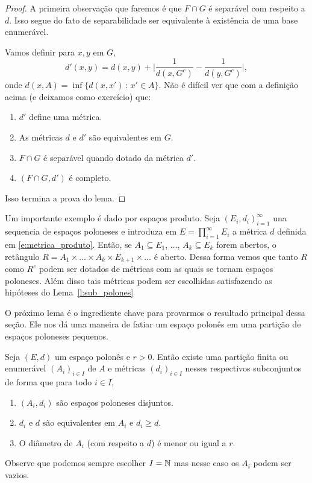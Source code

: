 \begin{topics}
\begin{proof}
  A primeira observação que faremos é que $F \cap G$ é separável com respeito a $d$.
  Isso segue do fato de separabilidade ser equivalente à existência de uma base enumerável.

  Vamos definir para $x, y$ em $G$,
  \begin{equation}
    d'(x,y) = d(x,y) + \Big| \frac{1}{d(x,G^c)} - \frac{1}{d(y,G^c)} \Big|,
  \end{equation}
  onde $d(x,A) = \inf\{d(x,x')\, : \, x' \in A\}$.
Não é difícil ver que com a definição acima (e deixamos como exercício) que:
\begin{enumerate}[\quad a)]
  \item $d'$ define uma métrica.
  \item As métricas $d$ e $d'$ são equivalentes em $G$.
  \item $F \cap G$ é separável quando dotado da métrica $d'$.
  \item $(F \cap G, d')$ é completo.
  \end{enumerate}
  Isso termina a prova do lema.
\end{proof}

\begin{example}
  Um importante exemplo é dado por espaços produto.
  Seja $(E_i, d_i)_{i=1}^\infty$ una sequencia de espaços poloneses e introduza em
  $E = \prod_{i=1}^{\infty} E_i$ a métrica $d$ definida em \eqref{e:metrica_produto}.
  Então, se $A_1 \subseteq E_1$, $\dots$, $A_k \subseteq E_k$ forem abertos, o retângulo $R = A_1 \times \dots \times A_k \times E_{k+1} \times \dots$ é aberto.
  Dessa forma vemos que tanto $R$ como $R^c$ podem ser dotados de métricas com as quais se tornam espaços poloneses.
  Além disso tais métricas podem ser escolhidas satisfazendo as hipóteses do Lema~\ref{l:sub_polones}
\end{example}

O próximo lema é o ingrediente chave para provarmos o resultado principal dessa seção.
Ele nos dá uma maneira de fatiar um espaço polonês em uma partição de espaços poloneses pequenos.

\begin{lemma}
  \label{l:particao_polones}
  Seja $(E, d)$ um espaço polonês e $r > 0$.
  Então existe uma partição finita ou enumerável $(A_i)_{i\in I}$ de $A$ e métricas $(d_i)_{i\in I}$ nesses respectivos subconjuntos de forma
  que para todo $i\in I$,
  \begin{enumerate}[\quad a)]
  \item $(A_i, d_i)$ são espaços poloneses disjuntos.
  \item $d_i$ e $d$ são equivalentes em $A_i$ e $d_i \geq d$.
  \item O diâmetro de $A_i$ (com respeito a $d$) é menor ou igual a $r$.
  \end{enumerate}
  Observe que podemos sempre escolher $I={\mathbb N}$ mas nesse caso os $A_i$ podem ser vazios.
\end{lemma}


\end{topics}
